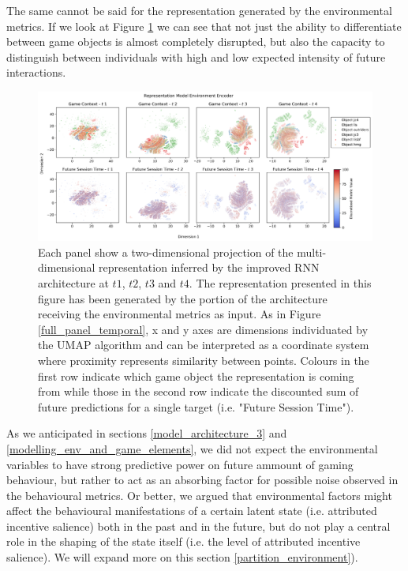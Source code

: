 The same cannot be said for the representation generated by the environmental metrics. If we look at Figure \ref{rnn_env_even_full_env} we can see that not just the ability to differentiate between game objects is almost completely disrupted, but also the capacity to distinguish between individuals with high and low expected intensity of future interactions. 

\begin{figure}[!htb]
\centering
\includegraphics[width=\textwidth]{images/chapter_4/RNN_env_even_0_lstm_layer_env_Future Session Time.png}
\caption[\textbf{Lower dimensional representation of the latent representations generated by the improved version of the RNN architecture from the environmental metrics}]{Each panel show a two-dimensional projection of the multi-dimensional representation inferred by the improved RNN architecture at $t1$, $t2$, $t3$ and $t4$. The representation presented in this figure has been generated by the portion of the architecture receiving the environmental metrics as input. As in Figure \ref{full_panel_temporal}, x and y axes are dimensions individuated by the UMAP algorithm and can be interpreted as a coordinate system where proximity represents similarity between points. Colours in the first row indicate which game object the representation is coming from while those in the second row indicate the discounted sum of future predictions for a single target (i.e. "Future Session Time").}
\label{rnn_env_even_full_env}
\end{figure}

As we anticipated in sections \ref{model_architecture_3} and \ref{modelling_env_and_game_elements}, we did not expect the environmental variables to have strong predictive power on future ammount of gaming behaviour, but rather to act as an absorbing factor for possible noise observed in the behavioural metrics. Or better, we argued that environmental factors might affect the behavioural manifestations of a certain latent state (i.e. attributed incentive salience) both in the past and in the future, but do not play a central role in the shaping of the state itself (i.e. the level of attributed incentive salience). We will expand more on this section \ref{partition_environment}).

